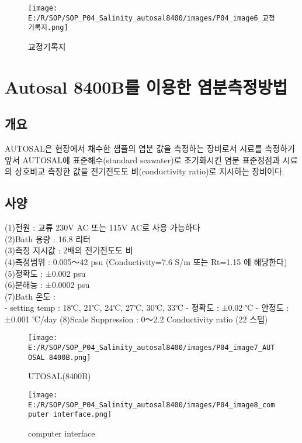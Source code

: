 \documentclass[
]{book}
\begin{document}
\begin{figure}
\centering
\texttt{[image: E:/R/SOP/SOP\_P04\_Salinity\_autosal8400/images/P04\_image6\_교정기록지.png]}
\caption{교정기록지}
\end{figure}

\hypertarget{autosal-8400buxb97c-uxc774uxc6a9uxd55c-uxc5fcuxbd84uxce21uxc815uxbc29uxbc95}{%
\section{Autosal 8400B를 이용한 염분측정방법}\label{autosal-8400buxb97c-uxc774uxc6a9uxd55c-uxc5fcuxbd84uxce21uxc815uxbc29uxbc95}}

\hypertarget{uxac1cuxc694}{%
\subsection{개요}\label{uxac1cuxc694}}

AUTOSAL은 현장에서 채수한 샘플의 염분 값을 측정하는 장비로서 시료를 측정하기 앞서 AUTOSAL에 표준해수(standard seawater)로 초기화시킨 염분 표준정점과 시료의 상호비교 측정한 값을 전기전도도 비(conductivity ratio)로 지시하는 장비이다.

\hypertarget{uxc0acuxc591}{%
\subsection{사양}\label{uxc0acuxc591}}

(1)전원 : 교류 230V AC 또는 115V AC로 사용 가능하다\\
(2)Bath 용량 : 16.8 리터\\
(3)측정 지시값 : 2배의 전기전도도 비\\
(4)측정범위 : 0.005～42 psu (Conductivity=7.6 S/m 또는 Rt=1.15 에 해당한다)\\
(5)정확도 : ±0.002 psu\\
(6)분해능 : ±0.0002 psu\\
(7)Bath 온도 :\\
- setting temp : 18℃, 21℃, 24℃, 27℃, 30℃, 33℃
- 정확도 : ±0.02 ℃
- 안정도 : ±0.001 ℃/day
(8)Scale Suppression : 0～2.2 Conductivity ratio (22 스텝)

\begin{figure}
\centering
\texttt{[image: E:/R/SOP/SOP\_P04\_Salinity\_autosal8400/images/P04\_image7\_AUTOSAL 8400B.png]}
\caption{UTOSAL(8400B)}
\end{figure}

\begin{figure}
\centering
\texttt{[image: E:/R/SOP/SOP\_P04\_Salinity\_autosal8400/images/P04\_image8\_computer interface.png]}
\caption{computer interface}
\end{figure}
\end{document}
